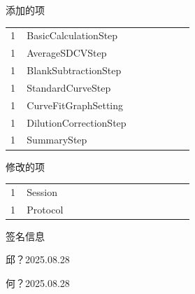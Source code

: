 \documentclass[UTF8,10pt,a4paper,fontset=fandol]{ctexart}
\newcommand{\fieldvalue}[1]{#1}
\newcommand{\handwritten}[1]{#1}
\begin{document}
\vspace{1em}

\noindent 添加的项

\begin{tabular}{@{}p{0.08\linewidth}p{0.82\linewidth}@{}}
\fieldvalue{1} &
\fieldvalue{BasicCalculationStep}
\\
\fieldvalue{1} &
\fieldvalue{AverageSDCVStep}
\\
\fieldvalue{1} &
\fieldvalue{BlankSubtractionStep}
\\
\fieldvalue{1} &
\fieldvalue{StandardCurveStep}
\\
\fieldvalue{1} &
\fieldvalue{CurveFitGraphSetting}
\\
\fieldvalue{1} &
\fieldvalue{DilutionCorrectionStep}
\\
\fieldvalue{1} &
\fieldvalue{SummaryStep}
\end{tabular}

\vspace{1em}

\noindent 修改的项

\begin{tabular}{@{}p{0.08\linewidth}p{0.82\linewidth}@{}}
\fieldvalue{1} &
\fieldvalue{Session}
\\
\fieldvalue{1} &
\fieldvalue{Protocol}
\end{tabular}

\vspace{1em}

\noindent 签名信息

\begin{flushright}
\handwritten{邱？2025.08.28}

\vspace{1em}

\handwritten{何？2025.08.28}
\end{flushright}
\end{document}
